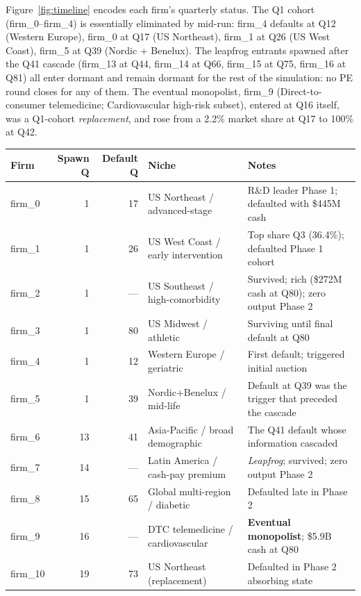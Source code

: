 \documentclass[11pt]{article}
\begin{document}
Figure~\ref{fig:timeline} encodes each firm's quarterly status. The Q1 cohort (firm\_0--firm\_4) is essentially eliminated by mid-run: firm\_4 defaults at Q12 (Western Europe), firm\_0 at Q17 (US Northeast), firm\_1 at Q26 (US West Coast), firm\_5 at Q39 (Nordic + Benelux). The leapfrog entrants spawned after the Q41 cascade (firm\_13 at Q44, firm\_14 at Q66, firm\_15 at Q75, firm\_16 at Q81) all enter dormant and remain dormant for the rest of the simulation: no PE round closes for any of them. The eventual monopolist, firm\_9 (Direct-to-consumer telemedicine; Cardiovascular high-risk subset), entered at Q16 itself, was a Q1-cohort \emph{replacement}, and rose from a 2.2\% market share at Q17 to 100\% at Q42.

\begin{table}[t]
\centering
\small
\begin{tabular}{lrrll}
\toprule
\textbf{Firm} & \textbf{Spawn Q} & \textbf{Default Q} & \textbf{Niche} & \textbf{Notes} \\
\midrule
firm\_0  & 1   & 17  & US Northeast / advanced-stage    & R\&D leader Phase 1; defaulted with \$445M cash \\
firm\_1  & 1   & 26  & US West Coast / early intervention & Top share Q3 (36.4\%); defaulted Phase 1 cohort \\
firm\_2  & 1   & --- & US Southeast / high-comorbidity  & Survived; rich (\$272M cash at Q80); zero output Phase 2 \\
firm\_3  & 1   & 80  & US Midwest / athletic            & Surviving until final default at Q80 \\
firm\_4  & 1   & 12  & Western Europe / geriatric       & First default; triggered initial auction \\
firm\_5  & 1   & 39  & Nordic+Benelux / mid-life        & Default at Q39 was the trigger that preceded the cascade \\
firm\_6  & 13  & 41  & Asia-Pacific / broad demographic & The Q41 default whose information cascaded \\
firm\_7  & 14  & --- & Latin America / cash-pay premium & \emph{Leapfrog}; survived; zero output Phase 2 \\
firm\_8  & 15  & 65  & Global multi-region / diabetic   & Defaulted late in Phase 2 \\
firm\_9  & 16  & --- & DTC telemedicine / cardiovascular& \textbf{Eventual monopolist}; \$5.9B cash at Q80 \\
firm\_10 & 19  & 73  & US Northeast (replacement)       & Defaulted in Phase 2 absorbing state \\

\end{tabular}
\end{table}
\end{document}
